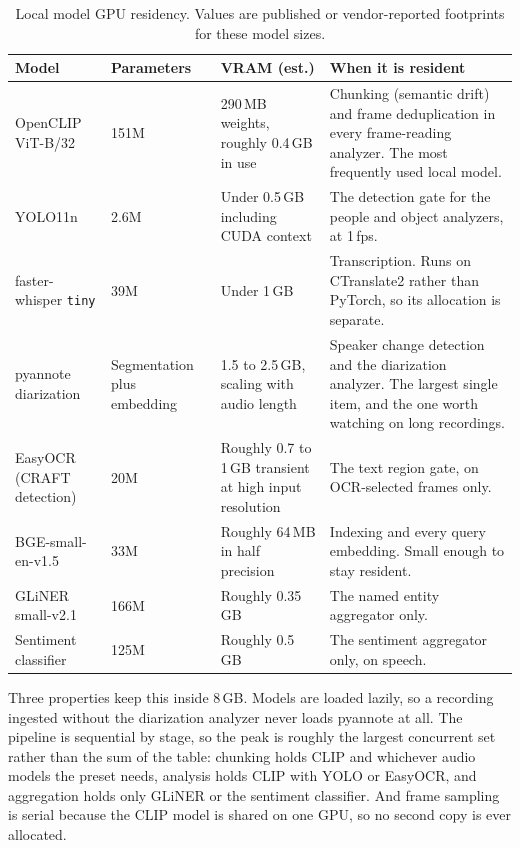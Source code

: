 \documentclass[11pt,a4paper]{article}
\begin{document}
\begin{table}[htbp]
\centering
\small
\begin{tabularx}{\textwidth}{@{}L{3.2cm}L{1.9cm}L{2.0cm}X@{}}
\toprule
\textbf{Model} & \textbf{Parameters} & \textbf{VRAM (est.)} & \textbf{When it is resident} \\
\midrule
OpenCLIP ViT-B/32 & 151M & 290\,MB weights, roughly 0.4\,GB in use & Chunking (semantic drift) and frame deduplication in every frame-reading analyzer. The most frequently used local model. \\
YOLO11n & 2.6M & Under 0.5\,GB including CUDA context & The detection gate for the people and object analyzers, at 1\,fps. \\
faster-whisper \texttt{tiny} & 39M & Under 1\,GB & Transcription. Runs on CTranslate2 rather than PyTorch, so its allocation is separate. \\
pyannote diarization & Segmentation plus embedding & 1.5 to 2.5\,GB, scaling with audio length & Speaker change detection and the diarization analyzer. The largest single item, and the one worth watching on long recordings. \\
EasyOCR (CRAFT detection) & 20M & Roughly 0.7 to 1\,GB transient at high input resolution & The text region gate, on OCR-selected frames only. \\
BGE-small-en-v1.5 & 33M & Roughly 64\,MB in half precision & Indexing and every query embedding. Small enough to stay resident. \\
GLiNER small-v2.1 & 166M & Roughly 0.35\,GB & The named entity aggregator only. \\
Sentiment classifier & 125M & Roughly 0.5\,GB & The sentiment aggregator only, on speech. \\
\bottomrule
\end{tabularx}
\caption{Local model GPU residency. Values are published or vendor-reported
footprints for these model sizes.}
\end{table}

Three properties keep this inside 8\,GB. Models are loaded lazily, so a
recording ingested without the diarization analyzer never loads pyannote at all.
The pipeline is sequential by stage, so the peak is roughly the largest
concurrent set rather than the sum of the table: chunking holds CLIP and
whichever audio models the preset needs, analysis holds CLIP with YOLO or
EasyOCR, and aggregation holds only GLiNER or the sentiment classifier. And
frame sampling is serial because the CLIP model is shared on one GPU, so no
second copy is ever allocated.
\end{document}
